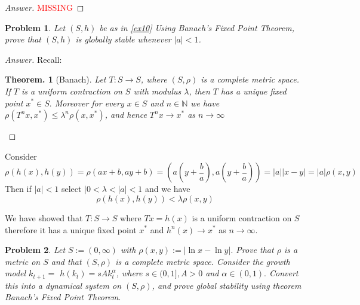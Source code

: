 \documentclass{article}
\newtheorem{teo}{Theorem. }
\newtheorem{problem}{Problem}[section]
\begin{document}
\begin{proof}[Answer]
    \textcolor{red}{MISSING}
\end{proof}


\begin{problem}
    Let $(S, h )$ be as in \ref{ex10} Using Banach's Fixed Point Theorem, prove that $(S, h )$ is globally stable whenever $| a | < 1$.
    
\end{problem}

\begin{proof}[Answer]
    Recall:
    \begin{teo}[Banach]
        Let $T: S \rightarrow S$, where $(S, \rho)$ is a complete metric space. If $T$ is a uniform contraction on $S$ with modulus $\lambda$, then $T$ has a unique fixed point $x^{*} \in S .$ Moreover for every $x \in S$ and $n \in \mathbb{N}$ we have $\rho\left(T^{n} x, x^{*}\right) \leq \lambda^{n} \rho\left(x, x^{*}\right)$, and hence $T^{n} x \rightarrow x^{*}$ as $n \rightarrow \infty$
    \end{teo}
\end{proof}

Consider $$\rho(h(x),h(y)) = \rho(ax + b, ay + b) = \left(a\left(y+\frac{b}{a}\right),a\left(y+\frac{b}{a}\right)\right) = |a||x-y| = |a|\rho(x,y)$$
Then if $|a|<1$ select $|0<\lambda < |a|<1$ and we have $$\rho(h(x),h(y))<\lambda \rho(x,y)$$

We have showed that $T:S\to S$ where $Tx = h(x)$ is a uniform contraction on $S$ therefore it has a unique fixed point $x^*$ and $h^n(x)\to x^*$ as $n\to \infty$.

\begin{problem}
    Let $S:=(0, \infty)$ with $\rho(x, y):=|\ln x-\ln y| .$ Prove that $\rho$ is a metric on $S$ and that $(S, \rho)$ is a complete metric space. Consider the growth model $k_{t+1}=$ $h\left(k_{t}\right)=s A k_{t}^{\alpha}$, where $s \in(0,1], A>0$ and $\alpha \in(0,1) .$ Convert this into a dynamical system on $(S, \rho)$, and prove global stability using theorem Banach's Fixed Point Theorem.
\end{problem}
\end{document}

